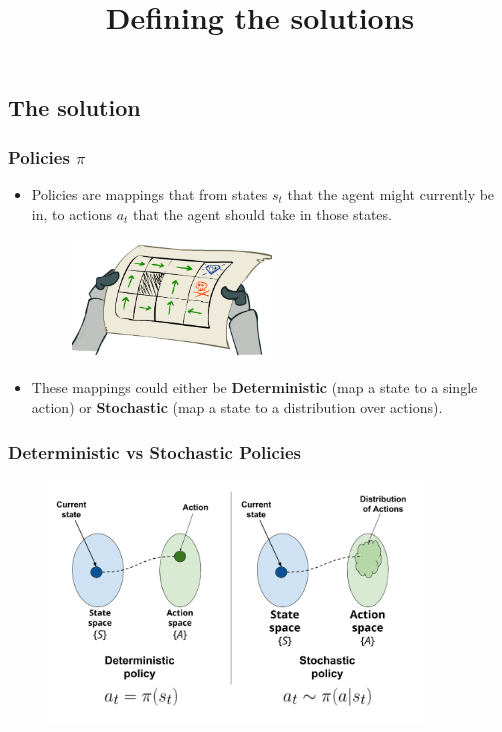 

\subsection{The solution} \title{Defining the solutions} \author{} \date{}
\begin{frame}[plain,c]
    \titlepage
\end{frame}

\begin{frame}
    \frametitle{Policies $\pi$}
    \begin{itemize}
        \item Policies are mappings that from states $s_{t}$ that the agent
              might currently be in, to actions $a_{t}$ that the agent should
              take in those states.
              \begin{figure}
                \centering
                \includegraphics[width=0.5\textwidth]{./imgs/img_rl_policies.png}
              \end{figure}
        \pause
        \item These mappings could either be \textbf{Deterministic} (map a state
              to a single action) or \textbf{Stochastic} (map a state to a distribution
              over actions).
    \end{itemize}
\end{frame}

\begin{frame}
    \frametitle{Deterministic vs Stochastic Policies}
    \begin{figure}
        \centering
        \includegraphics[width=0.9\textwidth]{./imgs/img_rl_policies_types.png}
    \end{figure}
\end{frame}

